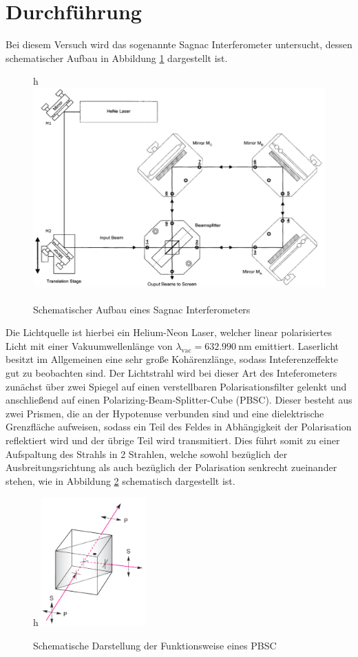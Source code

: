 \section{Durchführung}
\label{sec:Durchführung}

Bei diesem Versuch wird das sogenannte Sagnac Interferometer untersucht, dessen
schematischer Aufbau in Abbildung \ref{fig:aufbau} dargestellt ist.
\begin{figure}{h}
  \centering
  \includegraphics[width=14cm]{Aufbau.png}
  \caption{Schematischer Aufbau eines Sagnac Interferometers \cite{skript}}
  \label{fig:aufbau}
\end{figure}
Die Lichtquelle ist hierbei ein Helium-Neon Laser, welcher linear polarisiertes Licht
mit einer Vakuumwellenlänge von
$\lambda_{\text{vac}}=\SI{632.990}{\nano\metre}$ emittiert.
Laserlicht besitzt im Allgemeinen eine sehr große Kohärenzlänge, sodass Inteferenzeffekte gut zu beobachten sind.
Der Lichtstrahl wird bei dieser Art des Inteferometers zunächst über zwei Spiegel auf einen
verstellbaren Polarisationsfilter gelenkt und anschließend auf einen Polarizing-Beam-Splitter-Cube (PBSC).
Dieser besteht aus zwei Prismen, die an der Hypotenuse verbunden sind und eine dielektrische Grenzfläche
aufweisen, sodass ein Teil des Feldes in Abhängigkeit der Polarisation reflektiert wird
und der übrige Teil wird transmitiert. Dies führt somit zu einer Aufspaltung des Strahls
in 2 Strahlen, welche sowohl bezüglich der Ausbreitungsrichtung als auch
bezüglich der Polarisation senkrecht zueinander stehen, wie in Abbildung \ref{fig:PBSC}
schematisch dargestellt ist.\\
\begin{figure}{h}
  \centering
  \includegraphics[width=4cm]{PBSC.png}
  \caption{Schematische Darstellung der Funktionsweise eines PBSC \cite{online1}}
  \label{fig:PBSC}
\end{figure}
